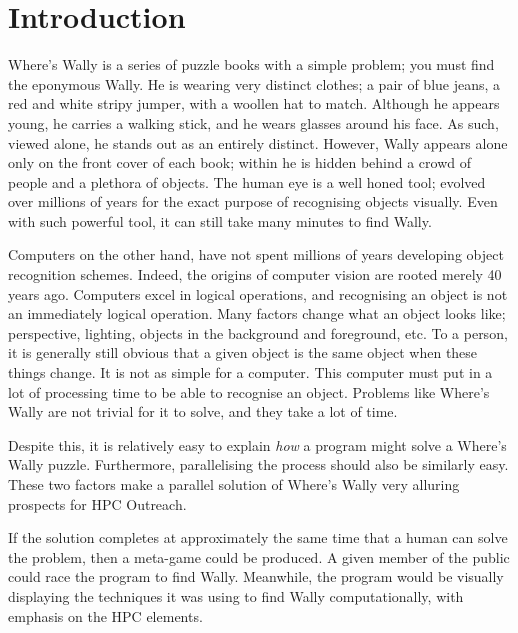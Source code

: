 \documentclass[../main.tex]{subfiles}
\begin{document}
  \section{Introduction}
  Where's Wally is a series of puzzle books with a simple problem; you must find the eponymous Wally.
  He is wearing very distinct clothes; a pair of blue jeans, a red and white stripy jumper, with a woollen hat to match.
  Although he appears young, he carries a walking stick, and he wears glasses around his face.
  As such, viewed alone, he stands out as an entirely distinct.
  However, Wally appears alone only on the front cover of each book; within he is hidden behind a crowd of people and a plethora of objects.
  The human eye is a well honed tool; evolved over millions of years for the exact purpose of recognising objects visually.
  Even with such powerful tool, it can still take many minutes to find Wally.

  Computers on the other hand, have not spent millions of years developing object recognition schemes.
  Indeed, the origins of computer vision are rooted merely 40 years ago.
  Computers excel in logical operations, and recognising an object is not an immediately logical operation.
  Many factors change what an object looks like; perspective, lighting, objects in the background and foreground, etc.
  To a person, it is generally still obvious that a given object is the same object when these things change.
  It is not as simple for a computer.
  This computer must put in a lot of processing time to be able to recognise an object.
  Problems like Where's Wally are not trivial for it to solve, and they take a lot of time.

  Despite this, it is relatively easy to explain \emph{how} a program might solve a Where's Wally puzzle.
  Furthermore, parallelising the process should also be similarly easy.
  These two factors make a parallel solution of Where's Wally very alluring prospects for HPC Outreach.

  If the solution completes at approximately the same time that a human can solve the problem, then a meta-game could be produced.
  A given member of the public could race the program to find Wally.
  Meanwhile, the program would be visually displaying the techniques it was using to find Wally computationally, with emphasis on the HPC elements.
  
  \biblio
\end{document}
